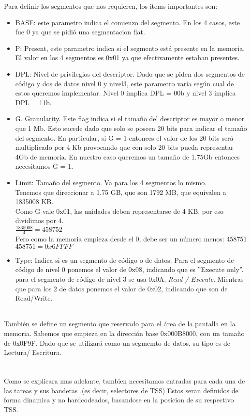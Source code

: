 Para definir los segmentos que nos requieren, los items importantes son:\\
\begin{itemize}
 \item BASE: este parametro indica el comienzo del segmento. En los 4 casos, este fue 0 ya que se pidió una segmentacion flat.
 \item P: Present, este parametro indica si el segmento est\'a presente en la memoria. El valor en los 4 segmentos es 0x01 ya que efectivamente estaban presentes.
 \item DPL: Nivel de privilegios del descriptor. Dado que se piden dos segmentos de código y dos de datos nivel 0 y nivel3, este 
parametro var\'ia seg\'un cual de estos queremos implementar. Nivel 0 implica DPL = 00b y nivel 3 implica DPL = 11b.
 \item G. Granularity. Este flag indica si el tamaño del descriptor es mayor o menor que 1 Mb. Esto sucede dado que solo se poseen 20 bits para 
indicar el tamaño del segmento. En particular, si G = 1 entonces el valor de los 20 bits ser\'a multiplicado por 4 Kb provocando que con 
 solo 20 bits pueda representar 4Gb de memoria. En nuestro caso queremos un tamaño de 1.75Gb entonces necesitamos G = 1.
 \item Limit: Tamaño del segmento. Va para los 4 segmentos lo mismo.\\
  \indent Tenemos que direccionar a 1.75 GB, que son 1792 MB, que equivalen a 1835008 KB.\\
  \indent Como G vale 0x01, las unidades deben representarse de 4 KB, por eso dividimos por 4.\\
  \indent $\frac{1835008}{4} = 458752$\\
  \indent Pero como la memoria empieza desde el 0, debe ser un n\'umero menos: 458751\\
  \indent $458751 = 0x6FFFF$
 \item Type: Indica si es un segmento de c\'odigo o de datos. Para el segmento de c\'odigo de nivel 0 ponemos el valor de 0x08, indicando 
que es ''Execute only''. para el segmento de c\'odigo de nivel 3 se usa 0x0A, \emph{Read / Execute}. Mientras que para los 2 de datos 
ponemos el valor de 0x02, indicando que son de Read/Write.
\end{itemize}

\\
Tambi\'en se define un segmento que reservado para el \'area de la pantalla en la memoria. Sabemos que empieza en la direcci\'on base
0x000B8000, con un tamaño de 0x0F9F. Dado que se utilizar\'a como un segmemto de datos, su tipo es de Lectura/ Escritura.\\\\
\\
Como se explicara mas adelante, tambien necesitamos entradas para cada una de las tareas y sus banderas .(es decir, selectores de TSS) Estos
seran definidos de forma dinamica y no hardcodeados, basandose en la posicion de su respectivo TSS.

